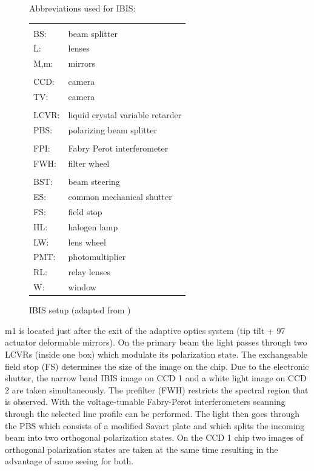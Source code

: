 \documentclass[a4paper,11pt]{article}
\begin{document}
\begin{figure}[h!]
\begin{minipage}[t]{0.55\textwidth}
	 \vspace{-26pt}\caption{IBIS setup (adapted from \citet{cavallini2006})}\label{img:ibis}
\end{minipage}
\hfill
\begin{minipage}[t]{0.45\textwidth}
\vspace{3pt}\sffamily
 Abbreviations used for IBIS:\\
 \begin{tabular}{p{0.8cm} l}
 &\\
 BS: & beam splitter\\
 L: & lenses\\
 M,m: & mirrors\\
 & \\
 CCD: & camera\\
 TV: & camera\\
 & \\
 LCVR: & liquid crystal variable retarder\\
 PBS: & polarizing beam splitter\\
 & \\
 FPI: & Fabry Perot interferometer\\
 FWH: & filter wheel\\
 &\\
 BST: & beam steering\\
 ES: & common mechanical shutter\\
 FS: & field stop\\
 HL: & halogen lamp\\
 LW: & lens wheel\\
 PMT: & photomultiplier\\
 RL: & relay lenses \\
 W: & window\\
 \end{tabular}
\end{minipage}
\end{figure}
\vspace{-5pt}
m1 is located just after the exit of the adaptive optics system (tip tilt + 97 actuator deformable mirrors). On the primary beam the light passes through two LCVRs (inside one box) which modulate its polarization state. The exchangeable field stop (FS) determines the size of the image on the chip. Due to the electronic shutter, the narrow band IBIS image on CCD 1 and a white light image on CCD 2 are taken simultaneously. The prefilter (FWH) restricts the spectral region that is observed. With the voltage-tunable Fabry-Perot interferometers scanning through the selected line profile can be performed. The light then goes through the PBS which consists of a modified Savart plate and which splits the incoming beam into two orthogonal polarization states. On the CCD 1 chip two images of orthogonal polarization states are taken at the same time resulting in the advantage of same seeing for both.
\end{document}
